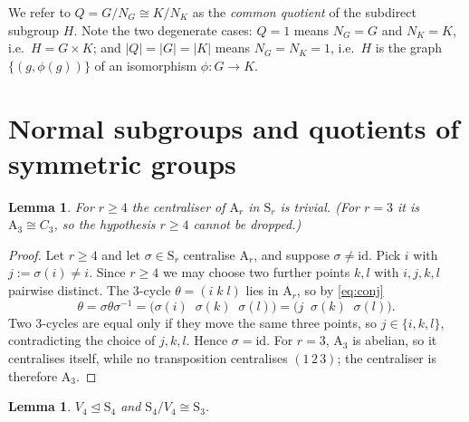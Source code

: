 \documentclass[11pt]{article}
\theoremstyle{plain}
\newtheorem{lemma}[theorem]{Lemma}
\theoremstyle{definition}
\theoremstyle{remark}
\numberwithin{equation}{section}
\newcommand{\Sym}{\mathrm{S}}
\newcommand{\Alt}{\mathrm{A}}
\newcommand{\normal}{\trianglelefteq}
\begin{document}
We refer to $Q = G/N_G \cong K/N_K$ as the \emph{common quotient} of the subdirect subgroup $H$.
Note the two degenerate cases: $Q = 1$ means $N_G = G$ and $N_K = K$, i.e.\ $H = G \times K$;
and $|Q| = |G| = |K|$ means $N_G = N_K = 1$, i.e.\ $H$ is the graph
$\{(g,\phi(g))\}$ of an isomorphism $\phi : G \to K$.

\section{Normal subgroups and quotients of symmetric groups}
\label{sec:normal}

\begin{lemma}
\label{lem:centralizer}
For $r \ge 4$ the centraliser of $\Alt_r$ in $\Sym_r$ is trivial. (For $r = 3$ it is
$\Alt_3 \cong C_3$, so the hypothesis $r \ge 4$ cannot be dropped.)
\end{lemma}

\begin{proof}
Let $r \ge 4$ and let $\sigma \in \Sym_r$ centralise $\Alt_r$, and suppose $\sigma \ne
\mathrm{id}$. Pick $i$ with $j := \sigma(i) \ne i$. Since $r \ge 4$ we may choose two further
points $k,l$ with $i,j,k,l$ pairwise distinct. The $3$-cycle $\theta = (i\;k\;l)$ lies in
$\Alt_r$, so by \eqref{eq:conj}
\[
\theta = \sigma\theta\sigma^{-1} = \bigl(\sigma(i)\;\;\sigma(k)\;\;\sigma(l)\bigr)
       = \bigl(j\;\;\sigma(k)\;\;\sigma(l)\bigr).
\]
Two $3$-cycles are equal only if they move the same three points, so $j \in \{i,k,l\}$,
contradicting the choice of $j,k,l$. Hence $\sigma = \mathrm{id}$. For $r = 3$, $\Alt_3$ is
abelian, so it centralises itself, while no transposition centralises $(1\,2\,3)$; the
centraliser is therefore $\Alt_3$.
\end{proof}

\begin{lemma}
\label{lem:s4v4}
$V_4 \normal \Sym_4$ and $\Sym_4/V_4 \cong \Sym_3$.
\end{lemma}
\end{document}
